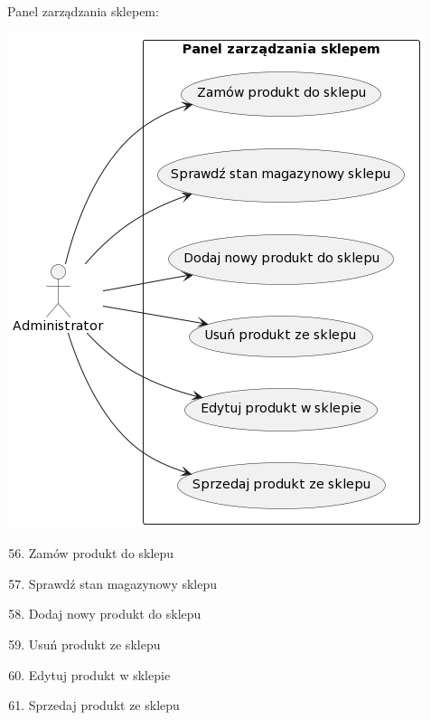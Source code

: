 \documentclass[
]{article}
\providecommand{\tightlist}{%
  \setlength{\itemsep}{0pt}\setlength{\parskip}{0pt}}
\begin{document}
{Panel zarządzania sklepem:}

{\includegraphics{diagrams/use_cases/sklep.png}}

\begin{enumerate}
\setcounter{enumi}{55}
\tightlist
\item
{Zamów produkt do sklepu}
\item
{Sprawdź stan magazynowy sklepu}
\item
{Dodaj nowy produkt do sklepu}
\item
{Usuń produkt ze sklepu}
\item
{Edytuj produkt w sklepie}
\item
{Sprzedaj produkt ze sklepu}
\end{enumerate}

{}
\end{document}
